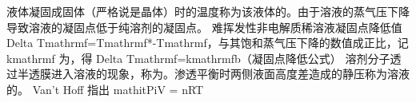 {}
\markdownRendererSectionEnd \markdownRendererSectionBegin
{}\markdownRendererInterblockSeparator
{}液体凝固成固体（严格说是晶体）时的温度称为该液体的。由于溶液的蒸气压下降导致溶液的凝固点低于纯溶剂的凝固点。\markdownRendererParagraphSeparator
{}难挥发性非电解质稀溶液凝固点降低值 \markdownRendererDollarSign{}\markdownRendererBackslash{}Delta T\markdownRendererUnderscore{}\markdownRendererBackslash{}mathrm\markdownRendererLeftBrace{}f\markdownRendererRightBrace{}=T\markdownRendererUnderscore{}\markdownRendererBackslash{}mathrm\markdownRendererLeftBrace{}f\markdownRendererRightBrace{}\markdownRendererCircumflex{}*-T\markdownRendererUnderscore{}\markdownRendererBackslash{}mathrm\markdownRendererLeftBrace{}f\markdownRendererRightBrace{}\markdownRendererDollarSign{}，与其饱和蒸气压下降的数值成正比，记 \markdownRendererDollarSign{}k\markdownRendererUnderscore{}\markdownRendererBackslash{}mathrm\markdownRendererLeftBrace{}f\markdownRendererRightBrace{}\markdownRendererDollarSign{} 为，得 \markdownRendererDollarSign{}\markdownRendererBackslash{}Delta T\markdownRendererUnderscore{}\markdownRendererBackslash{}mathrm\markdownRendererLeftBrace{}f\markdownRendererRightBrace{}=k\markdownRendererUnderscore{}\markdownRendererBackslash{}mathrm\markdownRendererLeftBrace{}f\markdownRendererRightBrace{}b\markdownRendererDollarSign{}（凝固点降低公式）\markdownRendererInterblockSeparator
{}
\markdownRendererSectionEnd \markdownRendererSectionBegin
{}\markdownRendererInterblockSeparator
{}溶剂分子透过半透膜进入溶液的现象，称为。渗透平衡时两侧液面高度差造成的静压称为溶液的。\markdownRendererParagraphSeparator
{}Van’t Hoff 指出 \markdownRendererDollarSign{}\markdownRendererBackslash{}mathit\markdownRendererLeftBrace{}\markdownRendererBackslash{}Pi\markdownRendererRightBrace{}V = nRT\markdownRendererDollarSign{}\markdownRendererInterblockSeparator
{}
\markdownRendererSectionEnd 
\markdownRendererSectionEnd 
\markdownRendererSectionEnd \markdownRendererSectionBegin
{}\markdownRendererInterblockSeparator
{}\markdownRendererSectionBegin
{}\markdownRendererInterblockSeparator
{}\markdownRendererSectionBegin
{}\markdownRendererInterblockSeparator
{}
\markdownRendererSectionEnd \markdownRendererSectionBegin
{}\markdownRendererInterblockSeparator
